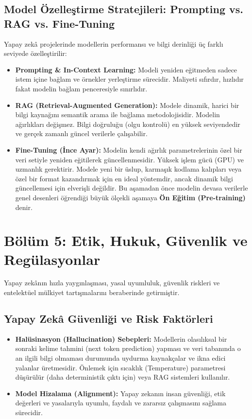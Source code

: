 \documentclass[11pt,a4paper,openany]{book}
\begin{document}
\needspace{9cm}
\subsection{Model Özelleştirme Stratejileri: Prompting vs. RAG vs. Fine-Tuning}
Yapay zekâ projelerinde modellerin performansı ve bilgi derinliği üç farklı seviyede özelleştirilir:
\begin{itemize}
    \item \textbf{Prompting \& In-Context Learning:} Modeli yeniden eğitmeden sadece istem içine bağlam ve örnekler yerleştirme sürecidir. Maliyeti sıfırdır, hızlıdır fakat modelin bağlam penceresiyle sınırlıdır.
    \item \textbf{RAG (Retrieval-Augmented Generation):} Modele dinamik, harici bir bilgi kaynağını semantik arama ile bağlama metodolojisidir. Modelin ağırlıkları değişmez. Bilgi doğruluğu (olgu kontrolü) en yüksek seviyendedir ve gerçek zamanlı güncel verilerle çalışabilir.
    \item \textbf{Fine-Tuning (İnce Ayar):} Modelin kendi ağırlık parametrelerinin özel bir veri setiyle yeniden eğitilerek güncellenmesidir. Yüksek işlem gücü (GPU) ve uzmanlık gerektirir. Modele yeni bir üslup, karmaşık kodlama kalıpları veya özel bir format kazandırmak için en ideal yöntemdir, ancak dinamik bilgi güncellemesi için elverişli değildir. Bu aşamadan önce modelin devasa verilerle genel desenleri öğrendiği büyük ölçekli aşamaya \textbf{Ön Eğitim (Pre-training)} denir.
\end{itemize}

\newpage
\section{Bölüm 5: Etik, Hukuk, Güvenlik ve Regülasyonlar}
Yapay zekânın hızla yaygınlaşması, yasal uyumluluk, güvenlik riskleri ve entelektüel mülkiyet tartışmalarını beraberinde getirmiştir.

\needspace{9cm}
\subsection{Yapay Zekâ Güvenliği ve Risk Faktörleri}
\begin{itemize}
    \item \textbf{Halüsinasyon (Hallucination) Sebepleri:} Modellerin olasılıksal bir sonraki kelime tahmini (next token prediction) yapması ve veri tabanında o an ilgili bilgi olmaması durumunda uydurma kaynakçalar ve ikna edici yalanlar üretmesidir. Önlemek için sıcaklık (Temperature) parametresi düşürülür (daha deterministik çıktı için) veya RAG sistemleri kullanılır.
    \item \textbf{Model Hizalama (Alignment):} Yapay zekanın insan güvenliği, etik değerleri ve yasalarıyla uyumlu, faydalı ve zararsız çalışmasını sağlama sürecidir.
\end{itemize}
\end{document}
